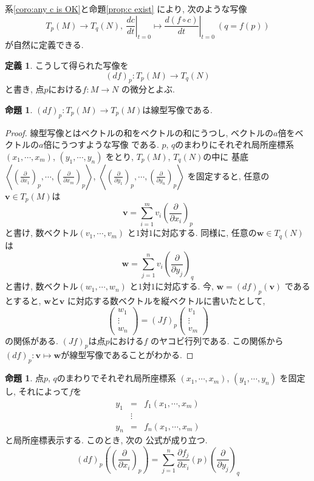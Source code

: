 \documentclass[a4j,12pt]{jarticle}
\theoremstyle{definition}
\newtheorem{definition}[theorem]{定義}
\newtheorem{proposition}[theorem]{命題}
\begin{document}
系\ref{coro:any c is OK}と命題\ref{prop:c exist}
により, 次のような写像
$$T_p(M)\to T_q(N),\ 
\left .\frac{dc}{dt}\right|_{t=0}\mapsto
\left .\frac{d(f\circ c)}{dt}\right|_{t=0}
\ (q=f(p))$$
が自然に定義できる. 
\begin{definition}\label{def:differential}
    こうして得られた写像を
    $$(df)_p:T_p(M)\to T_q(N)$$
    と書き, 点$p$における$f:M\to N$
    の微分とよぶ. 
\end{definition}
\begin{proposition}
    $(df)_p:T_p(M)\to T_p(M)$は線型写像である. 
\end{proposition}
\begin{proof}
    線型写像とはベクトルの和をベクトルの和にうつし, 
    ベクトルの$a$倍をベクトルの$a$倍にうつすような写像
    である. 
    $p$, $q$のまわりにそれぞれ局所座標系
    $(x_1,\cdots ,x_m)$, $(y_1,\cdots ,y_n)$
    をとり, $T_p(M)$, $T_q(N)$の中に
    基底$\left< \left(\frac{\partial}
    {\partial x_1}\right)_p,\cdots ,
    \left(\frac{\partial}
    {\partial x_m}\right)_p\right>$, 
    $\left< \left(\frac{\partial}
    {\partial y_1}\right)_p,\cdots ,
    \left(\frac{\partial}
    {\partial y_n}\right)_p\right>$
    を固定すると, 
    任意の$\boldsymbol{v}\in T_p(M)$は
    $$\boldsymbol{v}=
    \sum_{i=1}^{m}v_i
    \left(\frac{\partial}{\partial x_i}
    \right)_p$$
    と書け, 数ベクトル$(v_1,\cdots ,v_m)$
    と$1$対$1$に対応する. 同様に, 
    任意の$\boldsymbol{w}\in T_q(N)$は
    $$\boldsymbol{w}=
    \sum_{j=1}^{n}v_i
    \left(\frac{\partial}{\partial y_j}
    \right)_q$$
    と書け, 数ベクトル$(w_1,\cdots ,w_n)$
    と$1$対$1$に対応する. 今, 
    $\boldsymbol{w}=(df)_p(\boldsymbol{v})$
    であるとすると, 
    $\boldsymbol{w}$と$\boldsymbol{v}$
    に対応する数ベクトルを縦ベクトルに書いたとして, 
    $$\begin{pmatrix}
        w_1\\
        \vdots \\
        w_n
    \end{pmatrix}=(Jf)_p
    \begin{pmatrix}
        v_1\\
        \vdots \\
        v_m
    \end{pmatrix}$$
    の関係がある. $(Jf)_p$は点$p$における$f$
    のヤコビ行列である. この関係から
    $(df)_p:\boldsymbol{v}\mapsto 
    \boldsymbol{w}$が線型写像であることがわかる. 
\end{proof}
\begin{proposition}
    点$p$, $q$のまわりでそれぞれ局所座標系
    $(x_1,\cdots ,x_m)$, $(y_1,\cdots ,y_n)$
    を固定し, それによって$f$を
    \begin{eqnarray*}
        y_1&=&f_1(x_1,\cdots ,x_m)\\
        &\vdots&\\
        y_n&=&f_n(x_1,\cdots ,x_m)
    \end{eqnarray*}
    と局所座標表示する. このとき, 次の
    公式が成り立つ. 
    $$(df)_p\left( \left(
        \frac{\partial}{\partial x_i}
    \right)_p\right)=
    \sum_{j=1}^{n}\frac{\partial f_j}
    {\partial x_i}(p)\left(
        \frac{\partial}{\partial y_j}
    \right)_q$$
\end{proposition}
\end{document}
